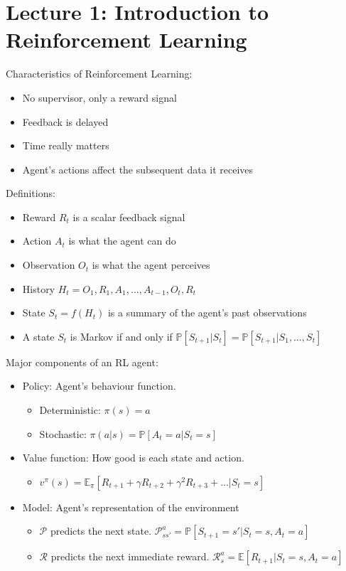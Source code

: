 \section{Lecture 1: Introduction to Reinforcement Learning}

Characteristics of Reinforcement Learning:
\begin{itemize}
    \item No supervisor, only a reward signal
    \item Feedback is delayed
    \item Time really matters
    \item Agent's actions affect the subsequent data it receives
\end{itemize}

\noindent Definitions:

\begin{itemize}
    \item Reward $R_t$ is a scalar feedback signal
    \item Action $A_t$ is what the agent can do
    \item Observation $O_t$ is what the agent perceives
    \item History $H_t = O_1, R_1, A_1, \ldots, A_{t-1}, O_t, R_t$
    \item State $S_t = f(H_t)$ is a summary of the agent's past observations
    \item A state $S_t$ is Markov if and only if $\mathbb{P}[S_{t+1}|S_t] =
              \mathbb{P}[S_{t+1}|S_1, \ldots, S_t]$
\end{itemize}

\noindent Major components of an RL agent:

\begin{itemize}
    \item Policy: Agent's behaviour function.
          \begin{itemize}
              \item Deterministic: $\pi(s) = a$
              \item Stochastic: $\pi(a|s) = \mathbb{P}[A_t = a | S_t = s]$
          \end{itemize}
    \item Value function: How good is each state and action.

          \begin{itemize}
              \item $v^{\pi}(s) =
                        \mathbb{E}_{\pi}[R_{t+1} + \gamma R_{t+2} + \gamma^2 R_{t+3} + \ldots | S_t =
                        s]$
          \end{itemize}
    \item Model: Agent's representation of the environment
          \begin{itemize}
              \item $\mathcal{P}$ predicts the next state. $\mathcal{P}_{ss'}^a = \mathbb{P}[S_{t+1} = s' | S_t = s, A_t = a]$
              \item $\mathcal{R}$ predicts the next immediate reward. $\mathcal{R}_s^a = \mathbb{E}[R_{t+1} | S_t = s, A_t = a]$
          \end{itemize}
\end{itemize}